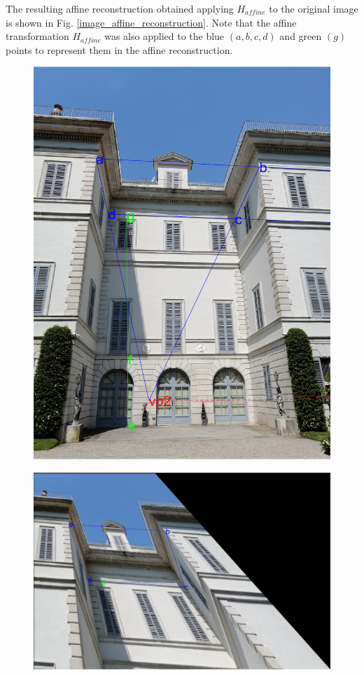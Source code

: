 \documentclass[11pt, oneside]{article}
\begin{document}
The resulting affine reconstruction obtained applying $H_{affine}$ to the original image is shown in Fig. \ref{image_affine_reconstruction}. Note that the affine transformation $H_{affine}$ was also applied to the blue $(a, b, c, d)$ and green $(g)$ points to represent them in the affine reconstruction.

\begin{figure}[!h]
	\centering
	\begin{minipage}{.40\textwidth}
		\centering
		\includegraphics[scale = 0.35]{image_original_lines.png}
		\label{image_original_lines}
	\end{minipage}%
	\quad
	\begin{minipage}{.55\textwidth}
		\centering
		\includegraphics[scale = 0.35]{image_affine_reconstruction.png}

\end{minipage}
\end{figure}
\end{document}
